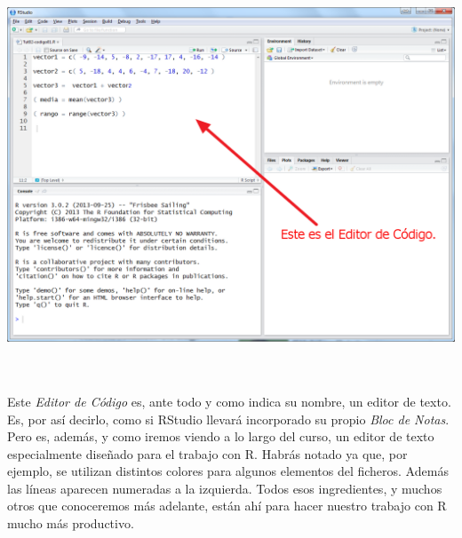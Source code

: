 \documentclass[10pt,a4paper]{article}\usepackage[]{graphicx}\usepackage[]{color}
\begin{document}
    \begin{center}
    \includegraphics[height=11cm]{../fig/Tut02-19a.png}
    \end{center}

\quad\\
Este {\em Editor de Código} es, ante todo y como indica su nombre, un editor de texto. Es, por así decirlo, como si RStudio llevará incorporado su propio {\em Bloc de Notas}. Pero es, además, y como iremos viendo a lo largo del curso, un editor de texto especialmente diseñado para el trabajo con R. Habrás notado ya que, por ejemplo, se utilizan distintos colores para algunos elementos del ficheros. Además las líneas aparecen numeradas a la izquierda. Todos esos ingredientes, y muchos otros que conoceremos más adelante, están ahí para hacer nuestro trabajo con R mucho más productivo.
\end{document}
